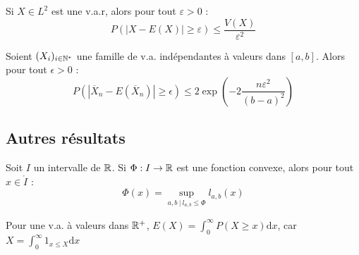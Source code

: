 \documentclass[11pt,a4paper]{article}
\begin{document}
\begin{corstar}
 Si $X\in L^2$ est une v.a.r, alors pour tout $\varepsilon >0$ :
\[P(|X-E(X)| \geq \varepsilon) \leq \frac{V(X)}{\varepsilon^2}\]
\end{corstar}

\begin{propstar}
Soient $(X_i)_{i\in \mathbb N^*}$ une famille de v.a. indépendantes à valeurs dans $[a,b]$. Alors pour tout $\epsilon > 0$ :
\[P( |\overline{X}_n - E(\overline{X}_n) | \geq \epsilon) \leq 2 \exp(-2\frac{n\varepsilon^2}{(b-a)^2})\]
\end{propstar}

\subsection*{Autres résultats}

\begin{lemmastar}
Soit $I$ un intervalle de $\mathbb R$. Si $ \Phi :I \to \mathbb R$ est une fonction convexe, alors pour tout $x\in \mathring{I}$ :
\[\Phi(x) = \sup_{a,b \ | \ l_{a,b} \leq \Phi } l_{a,b}(x)\]
\end{lemmastar}

\begin{lemmastar}
Pour une v.a. à valeurs dans $\mathbb R^+$, $\displaystyle E(X)=\int_0^\infty P(X \geq x) \mathrm{d}x$, car $\displaystyle X=\int_0^\infty 1_{x\leq X} \mathrm{d}x$
\end{lemmastar} 
\end{document}
